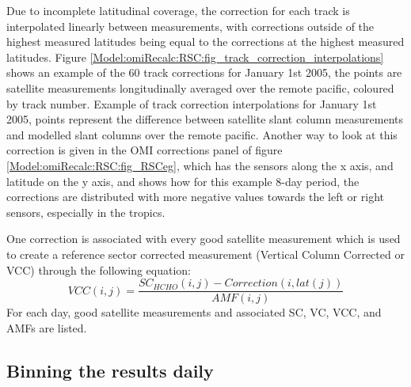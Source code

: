     Due to incomplete latitudinal coverage, the correction for each track is interpolated linearly between measurements, with corrections outside of the highest measured latitudes being equal to the corrections at the highest measured latitudes.
    Figure \ref{Model:omiRecalc:RSC:fig_track_correction_interpolations} shows an example of the 60 track corrections for January 1st 2005, the points are satellite measurements longitudinally averaged over the remote pacific, coloured by track number.
      {Example of track correction interpolations for January 1st 2005, points represent the difference between satellite slant column measurements and modelled slant columns over the remote pacific.}
      {\label{Model:omiRecalc:RSC:fig_track_correction_interpolations}}
    Another way to look at this correction is given in the OMI corrections panel of figure \ref{Model:omiRecalc:RSC:fig_RSCeg}, which has the sensors along the x axis, and latitude on the y axis, and shows how for this example 8-day period, the corrections are distributed with more negative values towards the left or right sensors, especially in the tropics.
    
    One correction is associated with every good satellite measurement which is used to create a reference sector corrected measurement (Vertical Column Corrected or VCC) through the following equation:
    \begin{equation}
    VCC(i,j) = \frac{SC_{HCHO}(i,j) - Correction(i,lat(j))}{AMF(i,j)}
    \end{equation}
    For each day, good satellite measurements and associated SC, VC, VCC, and AMFs are listed.
  
  \subsection{Binning the results daily}
    
